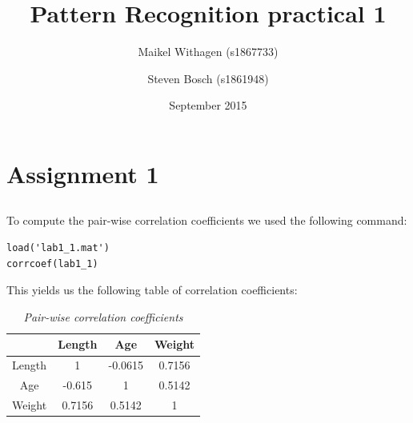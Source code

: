 \documentclass[10pt]{article}
\title{Pattern Recognition practical 1}
\author{Maikel Withagen (s1867733) \and Steven Bosch (s1861948)}
\date{September 2015}
\begin{document}
\maketitle

\section{Assignment 1}
\subsection{}
To compute the pair-wise correlation coefficients we used the following command:
\begin{lstlisting}[title= Input]
load('lab1_1.mat')
corrcoef(lab1_1)
\end{lstlisting}
This yields us the following table of correlation coefficients:
\begin{table}[H]
	\caption{\textit{Pair-wise correlation coefficients}}
	\vspace{0.1cm}
	\centering
	\begin{tabular}{|c|c|c|c|}
		\hline
		& Length & Age & Weight \\
		\hline
		Length & 1 & -0.0615 & 0.7156 \\
		\hline
		Age & -0.615 & 1 & 0.5142 \\
		\hline
		Weight & 0.7156 & 0.5142 & 1 \\ 
		\hline
	\end{tabular}
	\label{tab1.2}
\end{table}

\subsection{}
\end{document}
